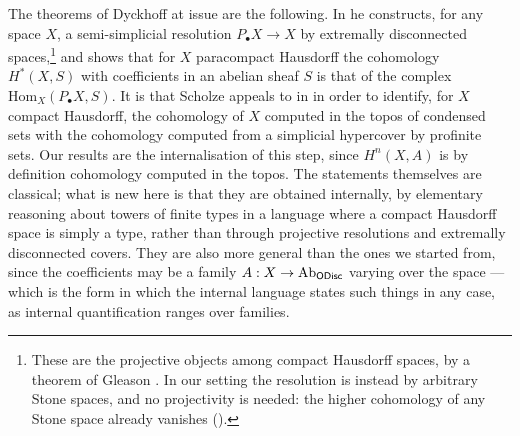 The theorems of Dyckhoff at issue are the following. In \cite{dyckhoff76-1} he
constructs, for any space $X$, a semi-simplicial resolution $P_\bullet X \to X$ by
extremally disconnected spaces,\footnote{These are the projective objects among
compact Hausdorff spaces, by a theorem of Gleason \cite{gleason58}. In our
setting the resolution is instead by arbitrary Stone spaces, and no projectivity
is needed: the higher cohomology of any Stone space already vanishes
().} and shows that
for $X$ paracompact Hausdorff the cohomology $H^\ast(X,S)$ with coefficients in an
abelian sheaf $S$ is that of the complex $\mathrm{Hom}_X(P_\bullet X, S)$. It is
\cite[Theorem 3.11]{dyckhoff76} that Scholze appeals to in \cite[Theorem
3.2]{Condensed} in order to identify, for $X$ compact Hausdorff, the cohomology of
$X$ computed in the topos of condensed sets with the cohomology computed from a simplicial hypercover by
profinite sets. Our results are
the internalisation of this step, since $H^n(X,A)$ is by definition
cohomology computed in the topos. The statements themselves are classical; what
is new here is that they are obtained internally, by elementary reasoning about
towers of finite types in a language where a compact Hausdorff space is simply a
type, rather than through projective resolutions and extremally disconnected
covers. They are also more general than the ones we started from, since the
coefficients may be a family $A : X \to \operatorname{Ab}_{\mathsf{ODisc}}$ varying over the
space --- which is the form in which the internal language states such things in
any case, as internal quantification ranges over families.

